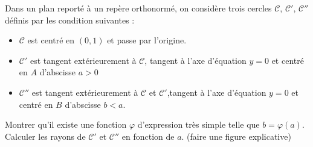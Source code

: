 Dans un plan report{\'e} {\`a} un rep{\`e}re orthonorm{\'e}, on consid{\`e}re trois
cercles $\mathcal{C}$, $\mathcal{C}'$, $\mathcal{C}''$ d{\'e}finis par
les condition suivantes :
\begin{itemize}
  \item $\mathcal{C}$ est centr{\'e} en $(0,1)$ et passe par
  l'origine.
  \item $\mathcal{C}'$ est tangent ext{\'e}rieurement {\`a} $\mathcal{C}$,
  tangent {\`a} l'axe d'{\'e}quation $y=0$ et centr{\'e} en $A$ d'abscisse
  $a>0$
  \item $\mathcal{C}''$ est tangent ext{\'e}rieurement {\`a} $\mathcal{C}$
  et $\mathcal{C}'$,tangent {\`a} l'axe d'{\'e}quation $y=0$ et centr{\'e} en $B$ d'abscisse
  $b<a$.
\end{itemize}
Montrer qu'il existe une fonction $\varphi$ d'expression tr{\`e}s
simple telle que $b=\varphi (a)$. Calculer les rayons de
$\mathcal{C}'$ et $\mathcal{C}''$ en fonction de $a$. (faire une
figure explicative)
